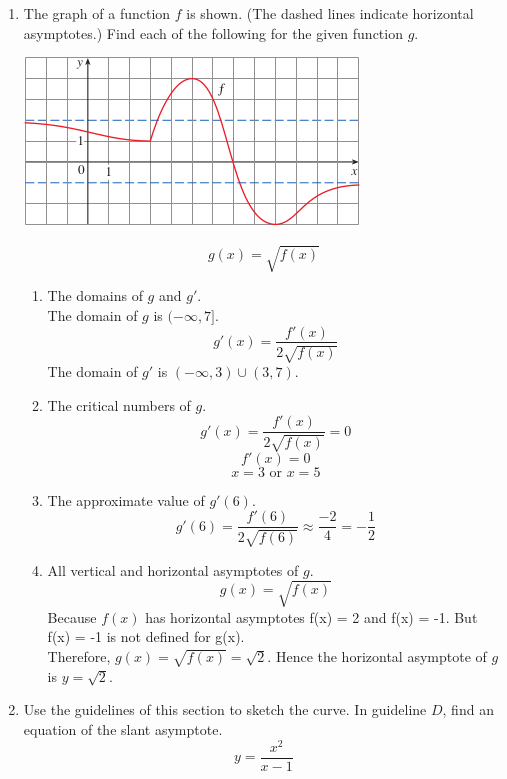 \documentclass[12pt]{article}
\begin{document}
\begin{enumerate}
\begin{enumerate}
\begin{figure}[!h]
            \end{figure}
        \end{enumerate}
        \setcounter{enumi}{40}
        \item The graph of a function $f$ is shown. (The dashed lines indicate horizontal asymptotes.) Find each of the following for the given function $g$.
            \begin{center}
                \includegraphics{img/img-1.png}
            \end{center}
            \[g(x) = \sqrt{f(x)}\]
            \begin{enumerate}
                \item The domains of $g$ and $g'$.\\
                    The domain of $g$ is $(-\infty, 7]$.
                    \[g'(x) = \frac{f'(x)}{2\sqrt{f(x)}}\]
                    The domain of $g'$ is $(-\infty, 3) \cup (3, 7)$.
                    \newpage
                \item The critical numbers of $g$.
                    \[g'(x) = \frac{f'(x)}{2\sqrt{f(x)}} = 0\]
                    \[f'(x) = 0\]
                    \[x = 3 \text{ or } x = 5\]
                \item The approximate value of $g'(6)$.
                    \[g'(6) = \frac{f'(6)}{2\sqrt{f(6)}} \approx \frac{-2}{4} = -\frac{1}{2}\]
                \item All vertical and horizontal asymptotes of $g$.
                    \[g(x) = \sqrt{f(x)}\]
                Because $f(x)$ has horizontal asymptotes f(x) = 2 and f(x) = -1. But f(x) = -1 is not defined for g(x).\\
                Therefore, $g(x) = \sqrt{f(x)} = \sqrt{2}$. Hence the horizontal asymptote of $g$ is $y = \sqrt{2}$.
            \end{enumerate}
            \setcounter{enumi}{52}
            \item Use the guidelines of this section to sketch the curve. In guideline $D$, find an equation of the slant asymptote.
                \[y = \frac{x^2}{x-1}\]

\end{enumerate}
\end{document}
